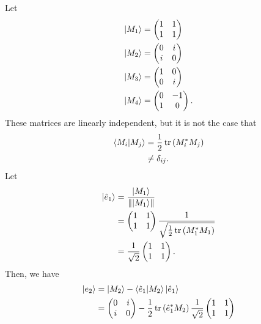 \documentclass[10pt]{mypackage}
\begin{document}
\begin{example}
Let
\begin{align*}
  \ket{M_1} &= \begin{pmatrix}1 & 1 \\ 1 & 1\end{pmatrix}\\
  \ket{M_2} &= \begin{pmatrix}0 & i \\ i & 0\end{pmatrix}\\
  \ket{M_3} &= \begin{pmatrix}1 & 0 \\ 0 & i\end{pmatrix}\\
  \ket{M_4} &= \begin{pmatrix}0 & -1 \\ 1 & 0\end{pmatrix}.
\end{align*}
These matrices are linearly independent, but it is not the case that
\begin{align*}
  \braket{M_i}{M_j} &= \frac{1}{2}\tr\left(M_{i}^{\ast}M_j\right)\\
                    &\neq \delta_{ij}.
\end{align*}
Let
\begin{align*}
  \ket{\hat{e}_1} &= \frac{\ket{M_1}}{\norm{\ket{M_1}}}\\
                  &= \begin{pmatrix} 1 & 1 \\ 1 & 1\end{pmatrix} \frac{1}{\sqrt{\frac{1}{2}\tr\left(M_{1}^{\ast}M_{1}\right)}}\\
                  &= \frac{1}{\sqrt{2}} \begin{pmatrix}1 & 1\\ 1 & 1\end{pmatrix}.
\end{align*}
Then, we have
\begin{align*}
  \ket{e_2} &= \ket{M_2} - \braket{\hat{e}_1}{M_2}\ket{\hat{e}_1}\\
            &= \begin{pmatrix}0 & i \\ i & 0\end{pmatrix} - \frac{1}{2}\tr\left(\hat{e}_1^{\ast}M_2\right)\frac{1}{\sqrt{2}} \begin{pmatrix}1 & 1 \\ 1 & 1\end{pmatrix}\\

\end{align*}
\end{example}
\end{document}
